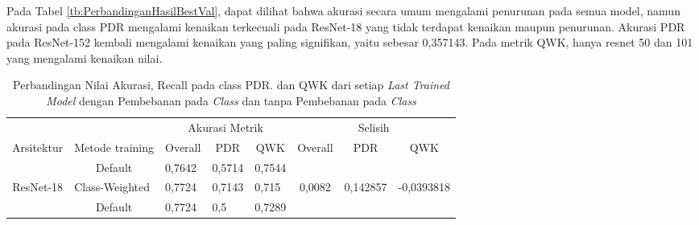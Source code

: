 Pada Tabel \ref{tb:PerbandinganHasilBestVal}, dapat dilihat bahwa akurasi secara umum mengalami penurunan pada semua model, namun akurasi pada class PDR mengalami kenaikan terkecuali pada ResNet-18 yang tidak terdapat kenaikan maupun penurunan. Akurasi PDR pada ResNet-152 kembali mengalami kenaikan yang paling signifikan, yaitu sebesar 0,357143. Pada metrik QWK, hanya resnet 50 dan 101 yang mengalami kenaikan nilai.
\pagebreak

\begin{table}[hbtp]
\begin{center}
	\caption{Perbandingan Nilai Akurasi, Recall pada class PDR. dan QWK dari setiap \emph{Last Trained Model} dengan Pembebanan pada \emph{Class} dan tanpa Pembebanan pada \emph{Class}}
	\label{tb:PerbandinganHasilLastTrained}
	\begin{tabular}{|c|c|lll|ccc|}
		\hline
		\cellcolor[HTML]{C0C0C0}                             & \cellcolor[HTML]{C0C0C0}                                  & \multicolumn{3}{c|}{\cellcolor[HTML]{C0C0C0}Akurasi Metrik}                           & \multicolumn{3}{c|}{\cellcolor[HTML]{C0C0C0}Selisih}                                                                            \\ \cline{3-8} 
		\multirow{-2}{*}{\cellcolor[HTML]{C0C0C0}Arsitektur} & \multirow{-2}{*}{\cellcolor[HTML]{C0C0C0}Metode training} & \multicolumn{1}{c|}{Overall} & \multicolumn{1}{c|}{PDR}    & \multicolumn{1}{c|}{QWK} & \multicolumn{1}{c|}{Overall}                   & \multicolumn{1}{c|}{PDR}                        & QWK                          \\ \hline
															 & Default                                                   & \multicolumn{1}{l|}{0,7642}  & \multicolumn{1}{l|}{0,5714} & 0,7544                   & \multicolumn{1}{c|}{}                          & \multicolumn{1}{c|}{}                           &                              \\ \cline{2-5}
		\multirow{-2}{*}{ResNet-18}                          & \multicolumn{1}{l|}{Class-Weighted}                       & \multicolumn{1}{l|}{0,7724}  & \multicolumn{1}{l|}{0,7143} & 0,715                    & \multicolumn{1}{c|}{\multirow{-2}{*}{0,0082}}  & \multicolumn{1}{c|}{\multirow{-2}{*}{0,142857}} & \multirow{-2}{*}{-0,0393818} \\ \hline
															 & Default                                                   & \multicolumn{1}{l|}{0,7724}  & \multicolumn{1}{l|}{0,5}    & 0,7289                   & \multicolumn{1}{c|}{}                          & \multicolumn{1}{c|}{}                           &                              \\ \cline{2-5}

\end{tabular}
\end{center}
\end{table}
